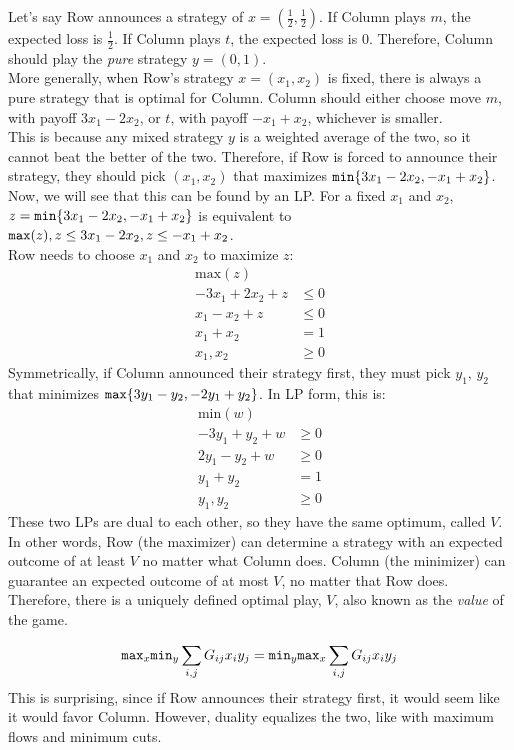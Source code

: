 Let's say Row announces a strategy of $x = (\frac{1}{2}, \frac{1}{2})$.
If Column plays $m$, the expected loss is $\frac{1}{2}$.
If Column plays $t$, the expected loss is $0$.
Therefore, Column should play the \textit{pure} strategy $y = (0, 1)$.\\
More generally, when Row's strategy $x = (x_1, x_2)$ is fixed, there is always a pure strategy that is optimal for Column.
Column should either choose move $m$, with payoff $3x_1 - 2x_2$, or $t$, with payoff $-x_1 + x_2$, whichever is smaller.\\
This is because any mixed strategy $y$ is a weighted average of the two, so it cannot beat the better of the two.
Therefore, if Row is forced to announce their strategy, they should pick $(x_1, x_2)$ that maximizes $\verb|min|\{3x_1 - 2x_2, -x_1 + x_2\}$.\\
Now, we will see that this can be found by an LP.
For a fixed $x_1$ and $x_2$, $z = \verb|min|\{3x_1-2x_2, -x_1 + x_2\}$ is equivalent to $\verb|max|(z), z \leq 3x_1 - 2x_2, z \leq -x_1 + x_2$.\\
Row needs to choose $x_1$ and $x_2$ to maximize $z$:
\begin{align*}
  \text{max}(z)\\
  -3x_1 + 2x_2 + z & \leq 0\\
  x_1 - x_2 + z & \leq 0\\
  x_1 + x_2 & = 1\\
  x_1, x_2 & \geq 0
\end{align*}
Symmetrically, if Column announced their strategy first, they must pick $y_1$, $y_2$ that minimizes $\verb|max|\{3y_1 - y_2, -2y_1 + y_{2}\}$.
In LP form, this is:
\begin{align*}
  \text{min}(w)\\
  -3y_1 + y_2 + w & \geq 0\\
  2y_1 - y_2 + w & \geq 0\\
  y_1 + y_2 & = 1 \\
  y_1, y_2 & \geq 0
\end{align*}
These two LPs are dual to each other, so they have the same optimum, called $V$.
In other words, Row (the maximizer) can determine a strategy with an expected outcome of at least $V$ no matter what Column does.
Column (the minimizer) can guarantee an expected outcome of at most $V$, no matter that Row does.
Therefore, there is a uniquely defined optimal play, $V$, also known as the \textit{value} of the game.\\
\begin{theorem}
  $$\verb|max|_x \verb|min|_y \sum_{i, j} G_{ij}x_i y_j = \verb|min|_y \verb|max|_x \sum_{i, j} G_{ij}x_iy_j$$
  This is surprising, since if Row announces their strategy first, it would seem like it would favor Column.
  However, duality equalizes the two, like with maximum flows and minimum cuts.
\end{theorem}

